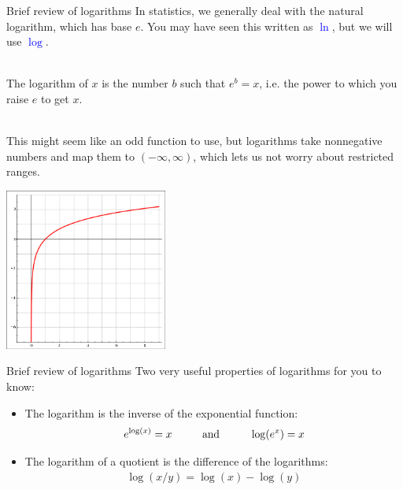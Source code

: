 \documentclass[10pt,t]{beamer}
\newcommand\tab[1][1cm]{\hspace*{#1}}
\begin{document}
\begin{frame}{Brief review of logarithms}
	\vspace{-0.6cm}
	In statistics, we generally deal with the natural logarithm, which has base $e$. You may have seen this written as \textcolor{blue}{$\ln$}, but we will use \textcolor{blue}{$\log$}. 
	\\ ~\
	
	The logarithm of $x$ is the number $b$ such that $e^b = x$, i.e. the power to which you raise $e$ to get $x$. 
	\\ ~\
	
	This might seem like an odd function to use, but logarithms take nonnegative numbers and map them to $(-\infty, \infty)$, which lets us not worry about restricted ranges. 
	
	\begin{center}
		\includegraphics[width=0.4\textwidth]{./figs/log}
	\end{center}
\end{frame}

\begin{frame}{Brief review of logarithms}
	Two very useful properties of logarithms for you to know: 
	\begin{itemize}
		\item The logarithm is the inverse of the exponential function:
		\begin{align*}
			e^{\log(x)} = x \tab \text{and} \tab \log(e^x) = x
		\end{align*}
	
		\item The logarithm of a quotient is the difference of the logarithms:
		\begin{align*}
			\log(x/y) = \log(x) - \log(y)
		\end{align*}
	\end{itemize}
\end{frame}
\end{document}
